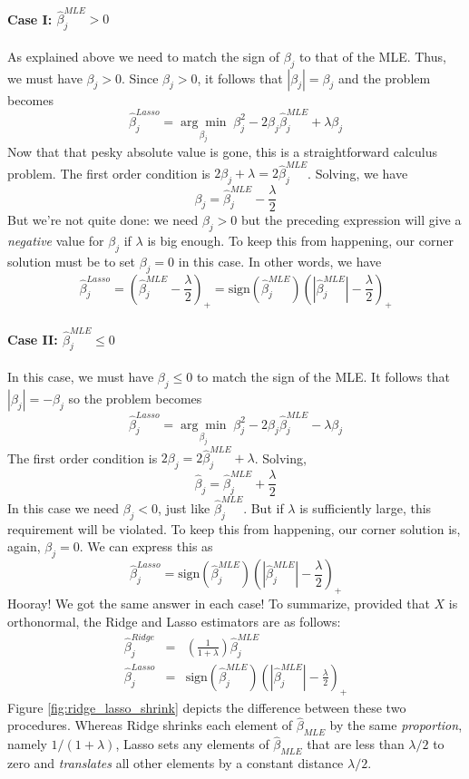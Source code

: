 \documentclass[12pt]{article}
\theoremstyle{definition}
\begin{document}
\paragraph{Case I: $\widehat{\beta}^{MLE}_j >0$} As explained above we need to match the sign of $\beta_j$ to that of the MLE. Thus, we must have $\beta_j > 0$. Since $\beta_j >0$, it follows that $|\beta_j| = \beta_j$ and the problem becomes
	$$\widehat{\beta}^{Lasso}_j = \underset{\beta_j}{\arg \min} \; \beta_j^2 - 2 \beta_j \widehat{\beta}^{MLE}_j + \lambda\beta_j$$
Now that that pesky absolute value is gone, this is a straightforward calculus problem. The first order condition is $2\beta_j + \lambda = 2 \widehat{\beta}^{MLE}_j$. Solving, we have
	$$\beta_j = \widehat{\beta}^{MLE}_j - \frac{\lambda}{2}$$
But we're not quite done: we need $\beta_j > 0$ but the preceding expression will give a \emph{negative} value for $\beta_j$ if $\lambda$ is big enough. To keep this from happening, our corner solution must be to set $\beta_j = 0$ in this case. In other words, we have
	$$\widehat{\beta}^{Lasso}_j = \left(\widehat{\beta}^{MLE}_j - \frac{\lambda}{2} \right)_+ = \mbox{sign}\left(\widehat{\beta}^{MLE}_j \right)\left(\left| \widehat{\beta}^{MLE}_j\right| - \frac{\lambda}{2} \right)_+$$

\paragraph{Case II: $\widehat{\beta}^{MLE}_j \leq 0$} In this case, we must have $\beta_j \leq 0$ to match the sign of the MLE. It follows that $|\beta_j| = -\beta_j$ so the problem becomes
$$\widehat{\beta}^{Lasso}_j = \underset{\beta_j}{\arg \min} \; \beta_j^2 - 2 \beta_j \widehat{\beta}^{MLE}_j - \lambda\beta_j$$
The first order condition is $2\beta_j = 2\widehat{\beta}^{MLE}_j +\lambda$. Solving,
	$$\widehat{\beta}_j = \widehat{\beta}^{MLE}_j + \frac{\lambda}{2}$$
In this case we need $\beta_j <0$, just like $\widehat{\beta}^{MLE}_j$. But if $\lambda$ is sufficiently large, this requirement will be violated. To keep this from happening, our corner solution is, again, $\beta_j = 0$. We can express this as 
	$$\widehat{\beta}^{Lasso}_j =\mbox{sign}\left(\widehat{\beta}^{MLE}_j \right)\left(\left| \widehat{\beta}^{MLE}_j\right| - \frac{\lambda}{2} \right)_+$$
Hooray! We got the same answer in each case! To summarize, provided that $X$ is orthonormal, the Ridge and Lasso estimators are as follows:
	\begin{eqnarray*}
		\widehat{\beta}^{Ridge}_j &=&  \left(\frac{1}{1+\lambda}\right)\widehat{\beta}^{MLE}_j\\
		\widehat{\beta}^{Lasso}_j &=&\mbox{sign}\left(\widehat{\beta}^{MLE}_j \right)\left(\left| \widehat{\beta}^{MLE}_j\right| - \frac{\lambda}{2} \right)_+
	\end{eqnarray*}
Figure \ref{fig:ridge_lasso_shrink} depicts the difference between these two procedures. Whereas Ridge shrinks each element of $\widehat{\beta}_{MLE}$ by the same \emph{proportion}, namely $1/(1+\lambda)$, Lasso sets any elements of $\widehat{\beta}_{MLE}$ that are less than $\lambda/2$ to zero and \emph{translates} all other elements by a constant distance $\lambda/2$. 
\end{document}
